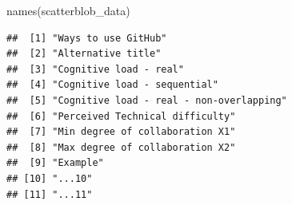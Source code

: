 \documentclass[
  11pt,
]{article}
\newenvironment{Shaded}{\begin{snugshade}}{\end{snugshade}}
\newcommand{\AttributeTok}[1]{\textcolor[rgb]{0.77,0.63,0.00}{#1}}
\newcommand{\DecValTok}[1]{\textcolor[rgb]{0.00,0.00,0.81}{#1}}
\newcommand{\FunctionTok}[1]{\textcolor[rgb]{0.00,0.00,0.00}{#1}}
\newcommand{\NormalTok}[1]{#1}
\newcommand{\OtherTok}[1]{\textcolor[rgb]{0.56,0.35,0.01}{#1}}
\newcommand{\SpecialCharTok}[1]{\textcolor[rgb]{0.00,0.00,0.00}{#1}}
\newcommand{\StringTok}[1]{\textcolor[rgb]{0.31,0.60,0.02}{#1}}
\begin{document}
\begin{Shaded}
\begin{Highlighting}[]
\FunctionTok{names}\NormalTok{(scatterblob\_data)}
\end{Highlighting}
\end{Shaded}

\begin{verbatim}
##  [1] "Ways to use GitHub"                     
##  [2] "Alternative title"                      
##  [3] "Cognitive load - real"                  
##  [4] "Cognitive load - sequential"            
##  [5] "Cognitive load - real - non-overlapping"
##  [6] "Perceived Technical difficulty"         
##  [7] "Min degree of collaboration X1"         
##  [8] "Max degree of collaboration X2"         
##  [9] "Example"                                
## [10] "...10"                                  
## [11] "...11"
\end{verbatim}

\begin{Shaded}
\end{Shaded}
\end{document}
